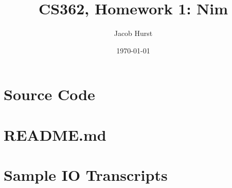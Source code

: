 \documentclass[12pt]{article}
\title{\textbf{CS362, Homework 1: Nim}}
\author{Jacob Hurst}
\date{\today}
\begin{document}
\maketitle

\section{Source Code}


\section{README.md}


\section{Sample IO Transcripts}

\end{document}
